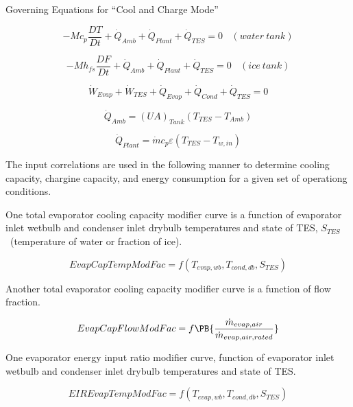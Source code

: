 Governing Equations for ``Cool and Charge Mode''

\begin{equation}
-M{c_p}\frac{{DT}}{{Dt}} + {\dot Q_{Amb}} + {\dot Q_{Plant}} + {\dot Q_{TES}} = 0 ~~~~ (water~tank)
\end{equation}

\begin{equation}
-M{h_{fs}}\frac{{DF}}{{Dt}} + {\dot Q_{Amb}} + {\dot Q_{Plant}} + {\dot Q_{TES}} = 0 ~~~~ (ice~tank)
\end{equation}

\begin{equation}
{\dot W_{Evap}} + {\dot W_{TES}} + {\dot Q_{Evap}} + {\dot Q_{Cond}} + {\dot Q_{TES}} = 0
\end{equation}

\begin{equation}
{\dot Q_{Amb}} = {\left( {UA} \right)_{Tank}}\left( {{T_{TES}} - {T_{Amb}}} \right)
\end{equation}

\begin{equation}
  {\dot Q_{Plant}} = \dot m{c_p}\varepsilon \left( {{T_{TES}} - {T_{w,in}}} \right)
\end{equation}

The input correlations are used in the following manner to determine cooling capacity, chargine capacity, and energy consumption for a given set of operationg conditions.

One total evaporator cooling capacity modifier curve is a function of evaporator inlet wetbulb and condenser inlet drybulb temperatures and state of TES, \({S_{TES}}\) ~(temperature of water or fraction of ice).

\begin{equation}
EvapCapTempModFac = f\left( {{T_{evap,wb}},{T_{cond,db}},{S_{TES}}} \right)
\end{equation}

Another total evaporator cooling capacity modifier curve is a function of flow fraction.

\begin{equation}
EvapCapFlowModFac = f\PB{\frac{\dot{m}_{evap,air}}{\dot{m}_{evap,air,rated}}}
\end{equation}

One evaporator energy input ratio modifier curve, function of evaporator inlet wetbulb and condenser inlet drybulb temperatures and state of TES.

\begin{equation}
EIREvapTempModFac = f\left( {{T_{evap,wb}},{T_{cond,db}},{S_{TES}}} \right)
\end{equation}

